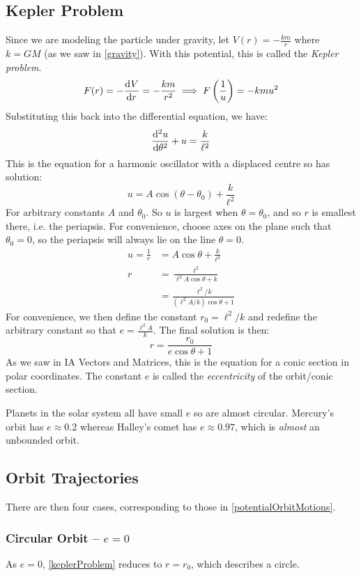 \documentclass[../main.tex]{subfiles}
\begin{document}
\subsection{Kepler Problem}
\label{keplerSection}
Since we are modeling the particle under gravity, let $V(r) = -\frac{km}{r}$ where $k = GM$ (as we saw in \cref{gravity}).
With this potential, this is called the \textit{Kepler problem}.
\[
  F(r) = -\deriv{V}{r} = - \frac{km}{r^2} \implies F\left(\frac{1}{u}\right) = -kmu^2
\]
Substituting this back into the differential equation, we have:
\[
  \deriv[2]{u}{\theta} + u = \frac{k}{\ell^2}
\]
This is the equation for a harmonic oscillator with a displaced centre so has solution:
\[
  u = A \cos(\theta - \theta_0) + \frac{k}{\ell^2}
\]
For arbitrary constants $A$ and $\theta_0$.
So $u$ is largest when $\theta = \theta_0$, and so $r$ is smallest there, i.e. the periapsis.
For convenience, choose axes on the plane such that $\theta_0 = 0$, so the periapsis will always lie on the line $\theta = 0$.
\begin{align*}
  u = \frac{1}{r} &= A\cos \theta + \frac{k}{\ell^2} \\
  r &= \frac{\ell^2}{\ell^2 A \cos \theta + k} \\
    &= \frac{\ell^2 / k}{(\ell^2 A/k) \cos \theta + 1}
\end{align*}
For convenience, we then define the constant $r_0 = \ell^2/k$ and redefine the arbitrary constant so that $e = \frac{\ell^2 A}{k}$.
The final solution is then:
\begin{equation}
  r = \frac{r_0}{e\cos \theta + 1} \label{keplerProblem}
\end{equation}
As we saw in IA Vectors and Matrices, this is the equation for a conic section in polar coordinates.
The constant $e$ is called the \textit{eccentricity} of the orbit/conic section.
\begin{remark}
  Planets in the solar system all have small $e$ so are almost circular.
  Mercury's orbit has $e \approx 0.2$ whereas Halley's comet has $e \approx 0.97$, which is \textit{almost} an unbounded orbit.
\end{remark}

\subsection{Orbit Trajectories}
\label{orbitTrajectories}
There are then four cases, corresponding to those in \cref{potentialOrbitMotions}.
\subsubsection{Circular Orbit -- $e = 0$}
As $e = 0$, \cref{keplerProblem} reduces to $r = r_0$, which describes a circle.
\end{document}
